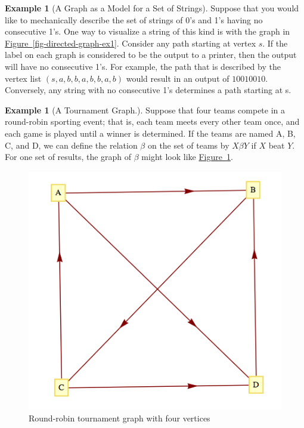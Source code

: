 \documentclass[10pt,]{book}
\theoremstyle{plain}
\theoremstyle{definition}
\theoremstyle{definition}
\theoremstyle{definition}
\newtheorem{example}[theorem]{Example}
\theoremstyle{definition}
\theoremstyle{definition}
\numberwithin{equation}{section}
\begin{document}
\begin{example}[A Graph as a Model for a Set of Strings]\label{ex-string-model-9-1}
Suppose that you would like to mechanically describe the set of strings of 0's and
1's having no consecutive 1's. One way to visualize a string of this kind is with the graph in \hyperref[fig-directed-graph-ex1]{Figure~\ref{fig-directed-graph-ex1}}. Consider any path starting at vertex \(s\). If the label on each graph is considered to be the output to a printer, then the output will have no consecutive 1's. For example, the path that is described by the vertex list \((s,a, b, b, a, b, b, a, b)\) would result in an output of \(10010010\). Conversely, any string with  no consecutive 1's determines a path starting at s.
%
\end{example}
\begin{example}[A Tournament Graph.]\label{ex-tournament-graph-9-1}
Suppose that four teams compete in a round-robin sporting event; that is, each team meets every other team
once, and each game is played until a winner is determined. If the teams are named A, B, C, and D, we can define the relation \(\beta\) on the set
of teams by \(X \beta  Y\) if \(X\) beat \(Y\). For one set of results, the graph of \(\beta\) might look like \hyperref[fig-tournament-graph-9-1]{Figure~\ref{fig-tournament-graph-9-1}}.%
\leavevmode%
\begin{figure}
\centering
\includegraphics[width=1\linewidth]{images/fig-tournament-graph-9-1.png}
\caption{Round-robin tournament graph with four vertices
                \label{fig-tournament-graph-9-1}}
\end{figure}
\end{example}
\end{document}
